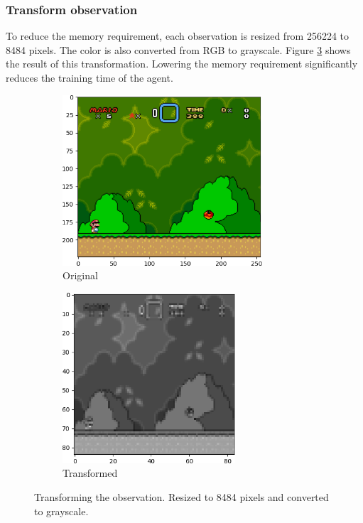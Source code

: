 \documentclass[a4paper]{article}
\begin{document}
\subsubsection{Transform observation}
To reduce the memory requirement, each observation is resized from 256\texttimes{}224 to 84\texttimes{}84 pixels.
The color is also converted from RGB to grayscale.
Figure \ref{fig:transformation} shows the result of this transformation.
Lowering the memory requirement significantly reduces the training time of the agent.
\begin{figure}[htbp]
    \centering
    \begin{subfigure}{.5\textwidth}
        \centering
        \includegraphics[height=6.35cm]{original_crop}
        \caption{Original}
        \label{fig:transformation:sub1}
    \end{subfigure}%
    \begin{subfigure}{.5\textwidth}
        \centering
        \includegraphics[height=6.35cm]{grayscale_crop}
        \caption{Transformed}
        \label{fig:transformation:sub2}
    \end{subfigure}
    \caption{Transforming the observation. Resized to 84\texttimes{}84 pixels and converted to grayscale.}
    \label{fig:transformation}
\end{figure}
\end{document}
